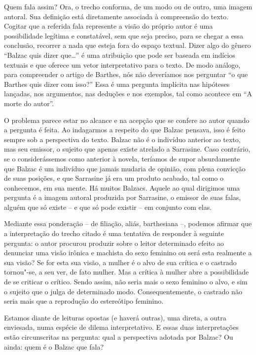 Quem fala assim? Ora, o trecho conforma, de um modo ou de outro, uma
imagem autoral. Sua definição está diretamente associada à compreensão
do texto. Cogitar que a referida fala represente a visão do próprio
autor é uma possibilidade legítima e constatável, sem que seja preciso,
para se chegar a essa conclusão, recorrer a nada que esteja fora do
espaço textual. Dizer algo do gênero ``Balzac quis dizer que\ldots{}'' é uma
atribuição que pode ser baseada em indícios textuais e que oferece um
vetor interpretativo para o texto. De modo análogo, para compreender o
artigo de Barthes, nós não deveríamos nos perguntar ``o que Barthes quis
dizer com isso?'' Essa é uma pergunta implícita nas hipóteses lançadas,
nos argumentos, nas deduções e nos exemplos, tal como acontece em ``A
morte do autor''.

O problema parece estar no alcance e na acepção que se confere ao autor
quando a pergunta é feita. Ao indagarmos a respeito do que Balzac
pensava, isso é feito sempre sob a perspectiva do texto. Balzac não é o
indivíduo anterior ao texto, mas seu emissor, o sujeito que apenas
existe atrelado a Sarrasine. Caso contrário, se o considerássemos como
anterior à novela, teríamos de supor absurdamente que Balzac é um
indivíduo que jamais mudaria de opinião, com plena convicção de suas
posições, e que Sarrasine já era um produto acabado, tal como o
conhecemos, em sua mente. Há muitos Balzacs. Aquele ao qual dirigimos
uma pergunta é a imagem autoral produzida por Sarrasine, o emissor de
suas falas, alguém que só existe -- e que só pode existir -- em conjunto
com elas.

Mediante essa ponderação -- de filiação, aliás, barthesiana --, podemos
afirmar que a interpretação do trecho citado é uma tentativa de
responder à seguinte pergunta: o autor procurou produzir sobre o leitor
determinado efeito ao denunciar uma visão irônica e machista do sexo
feminino ou será esta realmente a sua visão? Se for esta sua visão, a
mulher é o alvo de sua crítica e o castrado tornou"-se, a seu ver, de
fato mulher. Mas a crítica à mulher abre a possibilidade de se criticar
o crítico. Sendo assim, não seria mais o sexo feminino o alvo, e sim o
sujeito que o julga de determinado modo. Consequentemente, o castrado
não seria mais que a reprodução do estereótipo feminino.

Estamos diante de leituras opostas (e haverá outras), uma direta, a
outra enviesada, numa espécie de dilema interpretativo. E essas duas
interpretações estão circunscritas na pergunta: qual a perspectiva
adotada por Balzac? Ou ainda: quem é o Balzac que fala?

